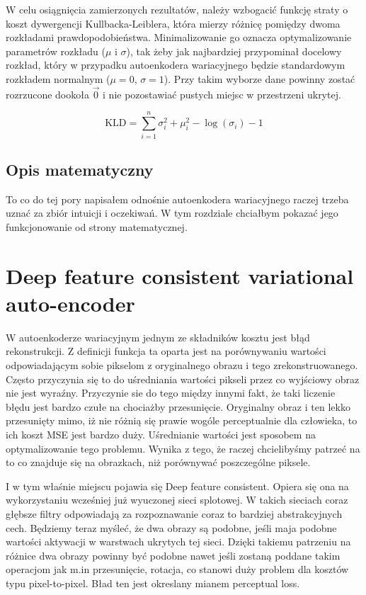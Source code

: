 W celu osiągnięcia zamierzonych rezultatów, należy wzbogacić funkcję straty o koszt dywergencji Kullbacka-Leiblera, która mierzy różnicę pomiędzy dwoma rozkładami prawdopodobieństwa. Minimalizowanie go oznacza optymalizowanie parametrów rozkładu ($\mu$ i $\sigma$), tak żeby jak najbardziej przypominał docelowy rozkład, który w przypadku autoenkodera wariacyjnego będzie standardowym rozkładem normalnym ($\mu = 0$,  $\sigma = 1$).
Przy takim wyborze dane powinny zostać rozrzucone dookoła $\vec{0}$ i nie pozostawiać pustych miejsc w przestrzeni ukrytej.

\begin{equation}
\mathrm { KLD } = \sum _ { i = 1 } ^ { n } \sigma _ { i } ^ { 2 } + \mu _ { i } ^ { 2 } - \log \left( \sigma _ { i } \right) - 1
\end{equation}


\subsection{Opis matematyczny}

To co do tej pory napisałem odnośnie autoenkodera wariacyjnego raczej trzeba uznać za zbiór intuicji i oczekiwań. W tym rozdziale chciałbym pokazać jego funkcjonowanie od strony matematycznej.



\section{Deep feature consistent variational auto-encoder}

W autoenkoderze wariacyjnym jednym ze składników kosztu jest błąd rekonstrukcji. Z definicji funkcja ta oparta jest na porównywaniu wartości odpowiadającym sobie pikselom z oryginalnego obrazu i tego zrekonstruowanego. Często przyczynia się to do uśredniania wartości pikseli przez co wyjściowy obraz nie jest wyraźny. Przyczynie sie do tego między innymi fakt, że taki liczenie błędu jest bardzo czułe na chociażby przesunięcie. Oryginalny obraz i ten lekko przesunięty mimo, iż nie różnią się prawie wogóle perceptualnie dla człowieka, to ich koszt MSE jest bardzo duży. Uśrednianie wartości jest sposobem na optymalizowanie tego problemu. Wynika z tego, że raczej chcielibyśmy patrzeć na to co znajduje się na obrazkach, niż porównywać poszczególne piksele.

I w tym właśnie miejscu pojawia się Deep feature consistent. Opiera się ona na wykorzystaniu wcześniej już wyuczonej sieci splotowej. W takich sieciach coraz głębsze filtry odpowiadają za rozpoznawanie coraz to bardziej abstrakcyjnych cech. Będziemy teraz myśleć, że dwa obrazy są podobne, jeśli maja podobne wartości aktywacji w warstwach ukrytych tej sieci. Dzięki takiemu patrzeniu na różnice dwa obrazy powinny być podobne nawet jeśli zostaną poddane takim operacjom jak m.in przesunięcie, rotacja, co stanowi duży problem dla kosztów typu pixel-to-pixel. Bład ten jest okreslany mianem perceptual loss.

